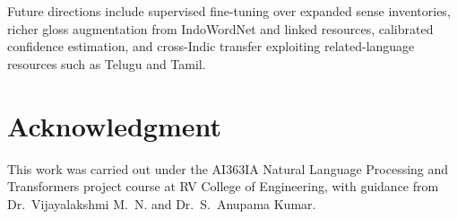 \documentclass[conference]{IEEEtran}
\begin{document}
Future directions include supervised fine-tuning over expanded sense inventories,
richer gloss augmentation from IndoWordNet and linked resources, calibrated
confidence estimation, and cross-Indic transfer exploiting related-language
resources such as Telugu and Tamil.

\section*{Acknowledgment}

This work was carried out under the AI363IA Natural Language Processing and
Transformers project course at RV College of Engineering, with guidance from
Dr.~Vijayalakshmi M.~N. and Dr.~S.~Anupama Kumar.
\end{document}
